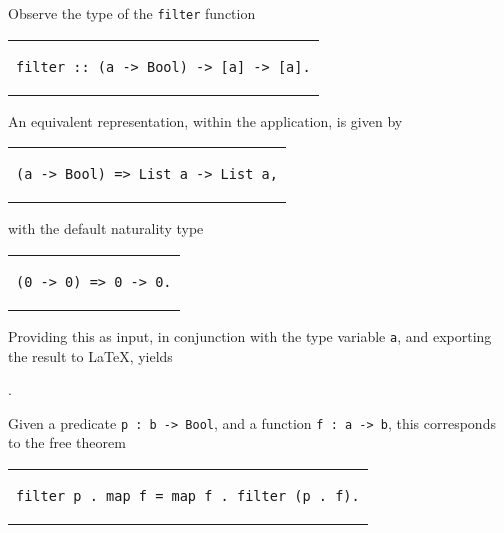 \documentclass[../Dissertation.tex]{subfiles}
\begin{document}
Observe the type of the \lstinline{filter} function
\begin{center}
\begin{tabular}{c}
\begin{lstlisting}
filter :: (a -> Bool) -> [a] -> [a].
\end{lstlisting}
\end{tabular}
\end{center}
An equivalent representation, within the application, is given by
\begin{center}
\begin{tabular}{c}
\begin{lstlisting}
(a -> Bool) => List a -> List a,
\end{lstlisting}
\end{tabular}
\end{center}
with the default naturality type
\begin{center}
\begin{tabular}{c}
\begin{lstlisting}
(0 -> 0) => 0 -> 0.
\end{lstlisting}
\end{tabular}
\end{center}
Providing this as input, in conjunction with the type variable \lstinline{a}, and exporting the result to LaTeX, yields
\begin{center}
  .
\end{center}
\noindent
Given a predicate \lstinline{p : b -> Bool}, and a function \lstinline{f : a -> b}, this corresponds to the free theorem
\begin{center}
\begin{tabular}{c}
\begin{lstlisting}
filter p . map f = map f . filter (p . f).
\end{lstlisting}
\end{tabular}
\end{center}
\end{document}
